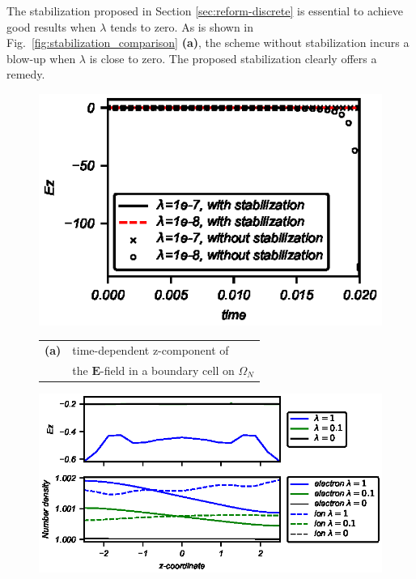 \documentclass{article}
\begin{document}
The stabilization proposed in Section \ref{sec:reform-discrete} is essential to achieve
good results when $\lambda$ tends to zero. As is shown in
Fig.~\ref{fig:stabilization_comparison} \textbf{(a)}, the scheme without stabilization incurs a blow-up
when $\lambda$ is close to zero. The proposed stabilization clearly offers a remedy.
\begin{figure}
    \centering
\begin{minipage}[t]{0.4\textwidth}\centering
  \includegraphics[width=\textwidth]{stabilizationComparision_stepVoltage.eps}

  \parbox{0.9\textwidth}{\begin{tabular}[c]{ll}
    \textbf{(a)} & time-dependent z-component of \\ & the $\mathbf{E}$-field
    in a boundary cell on $\Omega_N$
  \end{tabular}}
\end{minipage}%
 \begin{minipage}[t]{0.6\textwidth}\centering
   \includegraphics[width=\textwidth]{data-vs-z_stepVoltage.eps}


\end{minipage}
\end{figure}
\end{document}
